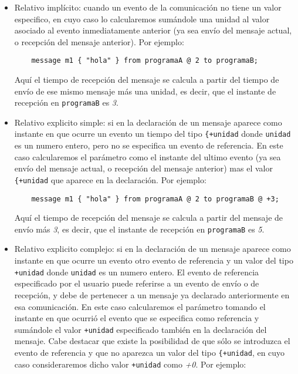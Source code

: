 \begin{itemize}
\item Relativo implícito: cuando un evento de la comunicación no tiene
  un valor especifico, en cuyo caso lo calcularemos sumándole una unidad al
  valor asociado al evento inmediatamente anterior (ya sea envío del
  mensaje actual, o recepción del mensaje anterior). Por ejemplo:

  \begin{lstlisting}
    message m1 { "hola" } from programaA @ 2 to programaB;
  \end{lstlisting}

  Aquí el tiempo de recepción del mensaje se calcula a partir del
  tiempo de envío de ese mismo mensaje más una unidad, es decir, que
  el instante de recepción en \lstinline{programaB} es \textit{3}.

\item Relativo explicito simple: si en la declaración de un mensaje
  aparece como instante en que ocurre un evento un tiempo del tipo
  \lstinline{{+unidad} donde \lstinline{unidad} es un numero 
  entero, pero no se especifica un evento de referencia. En este caso
  calcularemos el parámetro como el instante del ultimo evento (ya
  sea envío del mensaje actual, o recepción del mensaje anterior)
  mas el valor \lstinline{{+unidad} que aparece en la declaración. Por  
  ejemplo:
      
  \begin{lstlisting}
    message m1 { "hola" } from programaA @ 2 to programaB @ +3;
  \end{lstlisting}
      
  Aquí el tiempo de recepción del mensaje se calcula a partir del
  mensaje de envío más \textit{3}, es decir, que el instante de
  recepción en \lstinline{programaB} es \textit{5}.
      
\item Relativo explicito complejo: si en la declaración de un mensaje
  aparece como instante en que ocurre un evento otro evento de
  referencia y un valor del tipo \lstinline{+unidad} donde
  \lstinline{unidad} es un numero entero. El evento de referencia
  especificado por el usuario puede referirse a un evento de envío o
  de recepción, y debe de pertenecer a un mensaje ya declarado
  anteriormente en esa comunicación. En este caso calcularemos el
  parámetro tomando el instante en que ocurrió el evento que se
  especifica como referencia y sumándole el valor \lstinline{+unidad}
  especificado también en la declaración del mensaje. Cabe destacar
  que existe la posibilidad de que sólo se introduzca el evento de
  referencia y que no aparezca un valor del tipo \lstinline{{+unidad},
    en cuyo caso consideraremos dicho valor \lstinline{+unidad} como
    \textit{+0}. 
  Por ejemplo:


\end{itemize}
